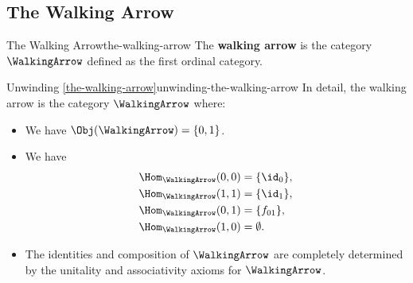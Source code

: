 \subsection{The Walking Arrow}\label{subsection-the-walking-arrow}
\begin{definition}{The Walking Arrow}{the-walking-arrow}%
    The \textbf{walking arrow} is the category $\WalkingArrow$ defined as the first ordinal category.%
\end{definition}
\begin{remark}{Unwinding \cref{the-walking-arrow}}{unwinding-the-walking-arrow}%
    In detail, the walking arrow is the category $\WalkingArrow$ where:
    \begin{itemize}
        \item{}We have $\Obj(\WalkingArrow)=\{0,1\}$.
        \item{}We have
            \begin{align*}
                \Hom_{\WalkingArrow}(0,0) &= \{\id_{0}\},\\
                \Hom_{\WalkingArrow}(1,1) &= \{\id_{1}\},\\
                \Hom_{\WalkingArrow}(0,1) &= \{f_{01}\},\\
                \Hom_{\WalkingArrow}(1,0) &= \emptyset.
            \end{align*}
        \item{}The identities and composition of $\WalkingArrow$ are completely determined by the unitality and associativity axioms for $\WalkingArrow$.
    \end{itemize}
\end{remark}
